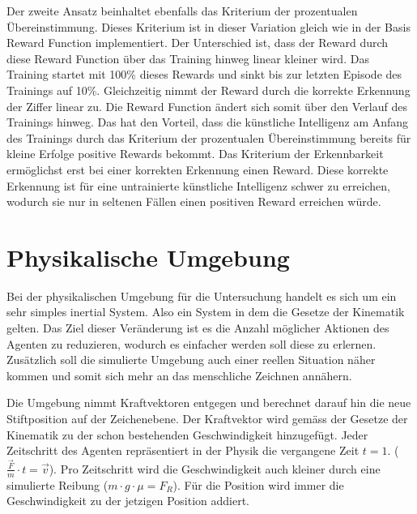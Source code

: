 Der zweite Ansatz beinhaltet ebenfalls das Kriterium der prozentualen
Übereinstimmung. Dieses Kriterium ist in dieser Variation gleich wie in der
Basis Reward Function implementiert. Der Unterschied ist, dass der Reward durch
diese Reward Function über das Training hinweg linear kleiner wird. Das Training
startet mit 100\% dieses Rewards und sinkt bis zur letzten Episode des Trainings
auf 10\%. Gleichzeitig nimmt der Reward durch die korrekte Erkennung der Ziffer
linear zu. Die Reward Function ändert sich somit über den Verlauf des Trainings
hinweg. Das hat den Vorteil, dass die künstliche Intelligenz am Anfang des
Trainings durch das Kriterium der prozentualen Übereinstimmung bereits für
kleine Erfolge positive Rewards bekommt. Das Kriterium der Erkennbarkeit
ermöglichst erst bei einer korrekten Erkennung einen Reward. Diese korrekte
Erkennung ist für eine untrainierte künstliche Intelligenz schwer zu erreichen,
wodurch sie nur in seltenen Fällen einen positiven Reward erreichen würde.






















\section{Physikalische Umgebung}
Bei der physikalischen Umgebung für die Untersuchung handelt es sich um ein sehr
simples inertial System. Also ein System in dem die Gesetze der Kinematik
gelten. Das Ziel dieser Veränderung ist es die Anzahl möglicher Aktionen des
Agenten zu reduzieren, wodurch es einfacher werden soll diese zu erlernen.
Zusätzlich soll die simulierte Umgebung auch einer reellen Situation näher
kommen und somit sich mehr an das menschliche Zeichnen annähern.

Die Umgebung nimmt Kraftvektoren entgegen und berechnet darauf hin die neue
Stiftposition auf der Zeichenebene. Der Kraftvektor wird gemäss der Gesetze der
Kinematik zu der schon bestehenden Geschwindigkeit hinzugefügt. Jeder
Zeitschritt des Agenten repräsentiert in der Physik die vergangene Zeit $t=1$.
($\frac{\vec{F}}{m}\cdot t=\vec{v}$). Pro Zeitschritt wird die Geschwindigkeit
auch kleiner durch eine simulierte Reibung ($m\cdot g \cdot \mu = F_R$). Für die
Position wird immer die Geschwindigkeit zu der jetzigen Position addiert.

